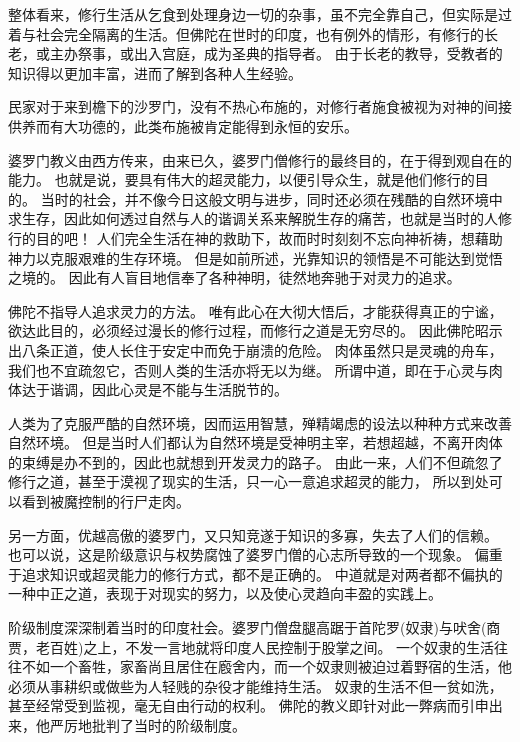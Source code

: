 \documentclass[twoside,openany]{book}
\begin{document}
整体看来，修行生活从乞食到处理身边一切的杂事，虽不完全靠自己，但实际是过着与社会完全隔离的生活。但佛陀在世时的印度，也有例外的情形，有修行的长老，或主办祭事，或出入宫庭，成为圣典的指导者。
由于长老的教导，受教者的知识得以更加丰富，进而了解到各种人生经验。

民家对于来到檐下的沙罗门，没有不热心布施的，对修行者施食被视为对神的间接供养而有大功德的，此类布施被肯定能得到永恒的安乐。

婆罗门教义由西方传来，由来已久，婆罗门僧修行的最终目的，在于得到观自在的能力。
也就是说，要具有伟大的超灵能力，以便引导众生，就是他们修行的目的。
当时的社会，并不像今日这般文明与进步，同时还必须在残酷的自然环境中求生存，因此如何透过自然与人的谐调关系来解脱生存的痛苦，也就是当时的人修行的目的吧！
人们完全生活在神的救助下，故而时时刻刻不忘向神祈祷，想藉助神力以克服艰难的生存环境。
但是如前所述，光靠知识的领悟是不可能达到觉悟之境的。
因此有人盲目地信奉了各种神明，徒然地奔驰于对灵力的追求。

佛陀不指导人追求灵力的方法。
唯有此心在大彻大悟后，才能获得真正的宁谧，欲达此目的，必须经过漫长的修行过程，而修行之道是无穷尽的。
因此佛陀昭示出八条正道，使人长住于安定中而免于崩溃的危险。
肉体虽然只是灵魂的舟车，我们也不宜疏忽它，否则人类的生活亦将无以为继。
所谓中道，即在于心灵与肉体达于谐调，因此心灵是不能与生活脱节的。

人类为了克服严酷的自然环境，因而运用智慧，殚精竭虑的设法以种种方式来改善自然环境。
但是当时人们都认为自然环境是受神明主宰，若想超越，不离开肉体的束缚是办不到的，因此也就想到开发灵力的路子。
由此一来，人们不但疏忽了修行之道，甚至于漠视了现实的生活，只一心一意追求超灵的能力，
所以到处可以看到被魔控制的行尸走肉。

另一方面，优越高傲的婆罗门，又只知竞遂于知识的多寡，失去了人们的信赖。
也可以说，这是阶级意识与权势腐蚀了婆罗门僧的心志所导致的一个现象。
偏重于追求知识或超灵能力的修行方式，都不是正确的。
中道就是对两者都不偏执的一种中正之道，表现于对现实的努力，以及使心灵趋向丰盈的实践上。

阶级制度深深制着当时的印度社会。婆罗门僧盘腿高踞于首陀罗(奴隶)与吠舍(商贾，老百姓)之上，不发一言地就将印度人民控制于股掌之间。
一个奴隶的生活往往不如一个畜牲，家畜尚且居住在廏舍内，而一个奴隶则被迫过着野宿的生活，他必须从事耕织或做些为人轻贱的杂役才能维持生活。
奴隶的生活不但一贫如洗，甚至经常受到监视，毫无自由行动的权利。
佛陀的教义即针对此一弊病而引申出来，他严厉地批判了当时的阶级制度。

\end{document}
